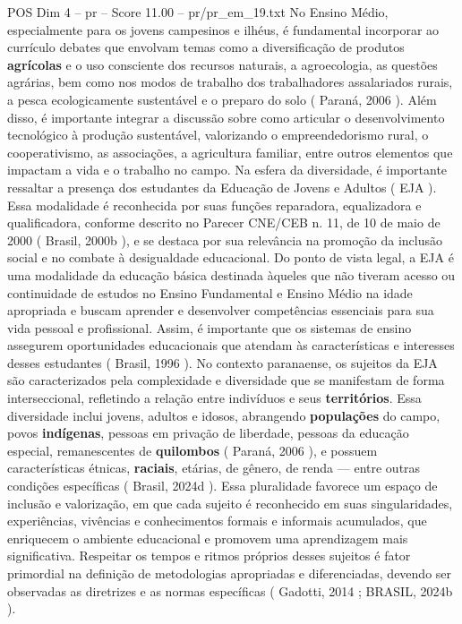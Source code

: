 \begin{textsample}{POS Dim 4 – pr – Score 11.00 – pr/pr\_em\_19.txt}
No Ensino Médio, especialmente para os jovens campesinos e ilhéus, é fundamental incorporar ao currículo debates que envolvam temas como a diversificação de produtos \textbf{agrícolas} e o uso consciente dos recursos naturais, a agroecologia, as questões agrárias, bem como nos modos de trabalho dos trabalhadores assalariados rurais, a pesca ecologicamente sustentável e o preparo do solo ( Paraná, 2006 ).
Além disso, é importante integrar a discussão sobre como articular o desenvolvimento tecnológico à produção sustentável, valorizando o empreendedorismo rural, o cooperativismo, as associações, a agricultura familiar, entre outros elementos que impactam a vida e o trabalho no campo.
Na esfera da diversidade, é importante ressaltar a presença dos estudantes da Educação de Jovens e Adultos ( EJA ).
Essa modalidade é reconhecida por suas funções reparadora, equalizadora e qualificadora, conforme descrito no Parecer CNE/CEB n. 11, de 10 de maio de 2000 ( Brasil, 2000b ), e se destaca por sua relevância na promoção da inclusão social e no combate à desigualdade educacional.
Do ponto de vista legal, a EJA é uma modalidade da educação básica destinada àqueles que não tiveram acesso ou continuidade de estudos no Ensino Fundamental e Ensino Médio na idade apropriada e buscam aprender e desenvolver competências essenciais para sua vida pessoal e profissional.
Assim, é importante que os sistemas de ensino assegurem oportunidades educacionais que atendam às características e interesses desses estudantes ( Brasil, 1996 ).
No contexto paranaense, os sujeitos da EJA são caracterizados pela complexidade e diversidade que se manifestam de forma interseccional, refletindo a relação entre indivíduos e seus \textbf{territórios}.
Essa diversidade inclui jovens, adultos e idosos, abrangendo \textbf{populações} do campo, povos \textbf{indígenas}, pessoas em privação de liberdade, pessoas da educação especial, remanescentes de \textbf{quilombos} ( Paraná, 2006 ), e possuem características étnicas, \textbf{raciais}, etárias, de gênero, de renda — entre outras condições específicas ( Brasil, 2024d ).
Essa pluralidade favorece um espaço de inclusão e valorização, em que cada sujeito é reconhecido em suas singularidades, experiências, vivências e conhecimentos formais e informais acumulados, que enriquecem o ambiente educacional e promovem uma aprendizagem mais significativa.
Respeitar os tempos e ritmos próprios desses sujeitos é fator primordial na definição de metodologias apropriadas e diferenciadas, devendo ser observadas as diretrizes e as normas específicas ( Gadotti, 2014 ; BRASIL, 2024b ).

\end{textsample}
